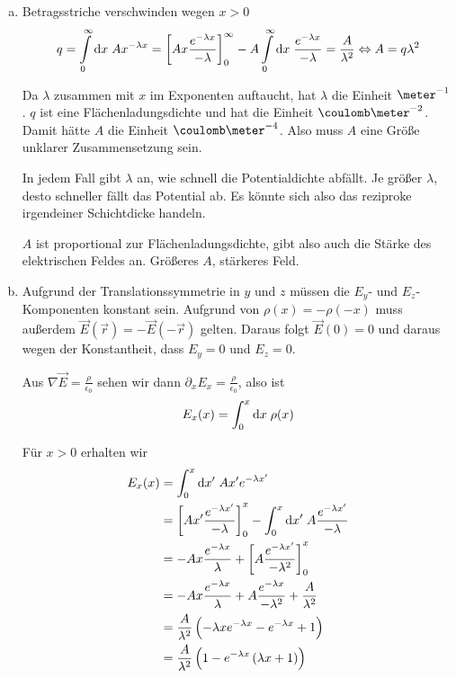 \documentclass[a4paper,german,12pt,smallheadings]{scrartcl}
\begin{document}
\begin{enumerate}[a)]
\item
  Betragsstriche verschwinden wegen $x > 0$
  \begin{equation}
    q = \int\limits_0^\infty \dif x \; Ax^{-\lambda x} =
    \sbr[3]{A x \frac{e^{-\lambda x}}{-\lambda}}_0^\infty -
    A \int\limits_0^\infty \dif x \; \frac{e^{-\lambda x}}{-\lambda} = \frac{A}{\lambda^2} \Leftrightarrow A = q \lambda^2
  \end{equation}

  Da $\lambda$ zusammen mit $x$ im Exponenten auftaucht, hat $\lambda$ die
  Einheit $\meter^{-1}$. $q$ ist eine Flächenladungsdichte und hat die
  Einheit $\coulomb\meter^{-2}$. Damit hätte $A$ die Einheit
  $\coulomb\meter^{-4}$. Also muss $A$ eine Größe unklarer Zusammensetzung
  sein.

  In jedem Fall gibt $\lambda$ an, wie schnell die Potentialdichte abfällt. Je
  größer $\lambda$, desto schneller fällt das Potential ab. Es könnte sich also
  das reziproke irgendeiner Schichtdicke handeln.

  $A$ ist proportional zur Flächenladungsdichte, gibt also auch die Stärke des
  elektrischen Feldes an. Größeres $A$, stärkeres Feld.
\item
  Aufgrund der Translationssymmetrie in $y$ und $z$ müssen die $E_y$- und
  $E_z$-Komponenten konstant sein. Aufgrund von $\rho(x) = -\rho(-x)$ muss
  außerdem $\vec{E}(\vec{r}) = -\vec{E}(-\vec{r})$ gelten. Daraus folgt
  $\vec{E}(0) = 0$ und daraus wegen der Konstantheit, dass $E_y = 0$ und $E_z =
  0$.

  Aus $\nabla \vec{E} = \frac{\rho}{\epsilon_0}$ sehen wir dann $\partial_x E_x
  = \frac{\rho}{\epsilon_0}$, also ist
  \begin{equation}
    E_x(x) = \int_0^x \dif x \; \rho(x)
  \end{equation}

  Für $x > 0$ erhalten wir
  \begin{align}
    E_x(x) &= \int_0^x \dif x' \; A x' e^{-\lambda x'} \\
    &= \sbr[3]{A x' \frac{e^{- \lambda x'}}{-\lambda}}_0^x - \int_0^x \dif x' \; A \frac{e^{- \lambda x'}}{-\lambda} \\
    &= -A x \frac{e^{- \lambda x}}{\lambda} + \sbr[3]{ A \frac{e^{- \lambda x'}}{-\lambda^2}}_0^x \\
    &= -A x \frac{e^{- \lambda x}}{\lambda} + A \frac{e^{- \lambda x}}{-\lambda^2} + \frac{A}{\lambda^2} \\
    &= \frac{A}{\lambda^2} \del{-\lambda x e^{-\lambda x} - e^{-\lambda x} + 1} \\
    &= \frac{A}{\lambda^2} \del{1 - e^{-\lambda x}\del{\lambda x + 1}}
  \end{align}


\end{enumerate}
\end{document}
